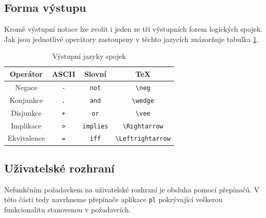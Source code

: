 \documentclass[thesis=B,czech,hidelinks]{thesis}[2012/06/26]
\begin{document}
\subsection{Forma výstupu}

Kromě výstupní notace lze zvolit i jeden ze tří výstupních forem logických spojek. Jak jsou jednotlivé operátory zastoupeny v těchto jazycích znázorňuje tabulka \ref{tab:connectives_language}.

\begin{table}
\centering
\caption{Výstupní jazyky spojek}
\label{tab:connectives_language}
\begin{tabular}{|c||c|c|c|}\hline
	Operátor & ASCII & Slovní & \TeX \tabularnewline \hline \hline
	Negace & \verb|-| & \verb|not| & \verb|\neg| \tabularnewline \hline
	Konjunkce & \verb|.| & \verb|and| & \verb|\wedge| \tabularnewline \hline
	Disjunkce & \verb|+| & \verb|or| & \verb|\vee| \tabularnewline \hline
	Implikace & \verb|>| & \verb|implies| & \verb|\Rightarrow| \tabularnewline \hline
	Ekvivalence & \verb|=| & \verb|iff| & \verb|\Leftrightarrow| \tabularnewline \hline
\end{tabular}
\end{table}

\subsection{Uživatelské rozhraní}

Nefunkčním požadavkem na uživatelské rozhraní je obsluha pomocí přepínačů. V této části tedy navrhneme přepínače aplikace \texttt{pl} pokrývající veškerou funkcionalitu stanovenou v požadavcích. 
\end{document}
